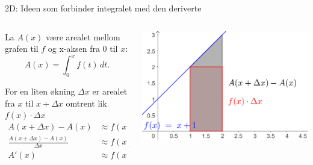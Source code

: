 
\blueheader
\begin{frame}{2D: Ideen som forbinder integralet med den deriverte}
\begin{columns}[onlytextwidth]
  \begin{column}{0.45\textwidth}
    La \(A(x)\) være arealet mellom grafen til \(f\)  og x-aksen fra \(0\) til \(x\):
    \[
    A(x)=\int_{0}^{x} f(t)\,dt.
    \]

    For en liten økning \(\Delta x\) er arealet fra \(x\) til \(x+\Delta x\) omtrent lik $ f(x)\cdot\Delta x$
    \begin{align*}
      A(x+\Delta x)-A(x) &\approx f(x)\,\Delta x\\[0.8em]
      \frac{A(x+\Delta x)-A(x)}{\Delta x} &\approx f(x)\\[0.8em]
      A'(x) &\approx f(x)
    \end{align*}
  \end{column}
  \begin{column}{0.55\textwidth}
    \centering
    \includegraphics[width=\linewidth]{R2-K2A-4.png}
  \end{column}
\end{columns}
\end{frame}

